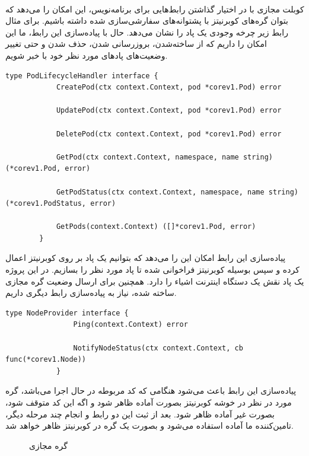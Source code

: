 \paragraph{}
{
    کوبلت مجازی با در اختیار گذاشتن رابط‌هایی برای برنامه‌نویس، این امکان را می‌دهد که بتوان گره‌های کوبرنیتز با پشتوانه‌های
    سفارشی‌سازی شده داشته باشیم. برای مثال رابط زیر چرخه وجودی یک پاد را نشان می‌دهد. حال با پیاده‌سازی این رابط، ما این امکان
    را داریم که از ساخته‌شدن، بروزرسانی شدن، حذف شدن و حتی تغییر وضعیت‌های پاد‌های مورد نظر خود با خبر شویم.
    \newpage
    \begin{latin}
    \begin{lstlisting}[caption=پاد وجودی چرخه کنترل‌کننده رابط]
        type PodLifecycleHandler interface {
            CreatePod(ctx context.Context, pod *corev1.Pod) error
        
            UpdatePod(ctx context.Context, pod *corev1.Pod) error
        
            DeletePod(ctx context.Context, pod *corev1.Pod) error
        
            GetPod(ctx context.Context, namespace, name string) (*corev1.Pod, error)
        
            GetPodStatus(ctx context.Context, namespace, name string) (*corev1.PodStatus, error)
        
            GetPods(context.Context) ([]*corev1.Pod, error)
        }        
    \end{lstlisting}
    \end{latin}

    پیاده‌سازی این رابط امکان این را می‌دهد که بتوانیم یک پاد بر روی کوبرنیتز اعمال کرده و سپس بوسیله کوبرنیتز فراخوانی شده تا پاد مورد نظر را بسازیم. در  این پروژه یک پاد نقش یک دستگاه اینترنت اشیاء را دارد.
    همچنین برای ارسال وضعیت گره مجازی ساخته شده، نیاز به پیاده‌سازی رابط دیگری داریم.

    \begin{latin}
        \begin{lstlisting}[caption={گره وضعیت کنترل‌کننده رابط}]
            type NodeProvider interface {
                Ping(context.Context) error

                NotifyNodeStatus(ctx context.Context, cb func(*corev1.Node))
            }

        \end{lstlisting}
    \end{latin}

    پیاده‌سازی این رابط باعث می‌شود هنگامی که کد مربوطه در حال اجرا می‌باشد، گره مورد در نظر در خوشه کوبرنیتز بصورت آماده ظاهر شود و اگه این کد متوقف شود، بصورت غیر آماده ظاهر شود.
    بعد از ثبت این دو رابط و انجام چند مرحله دیگر، تامین‌کننده ما آماده استفاده می‌شود و بصورت یک گره در کوبرنیتز ظاهر خواهد شد.
    \begin{figure}[H]
        \caption{گره مجازی}
        \label{fig:vkube_node}
    \end{figure}
}
